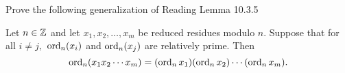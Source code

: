 \documentclass[handout]{ximera}
\begin{document}
\begin{br}
    Prove the following generalization of Reading Lemma 10.3.5
    
    
    \begin{lem*}
        Let $n\in\mathbb Z$ and let $x_1,x_2,\dots,x_m$ be reduced residues modulo $n$.  Suppose that for all $i\neq j,$ $\operatorname{ord}_n(x_i)$ and $\operatorname{ord}_n(x_j)$ are relatively prime. Then \[\operatorname{ord}_n(x_1 x_2\cdots x_m)=(\operatorname{ord}_n x_1)(\operatorname{ord}_n x_2)\cdots (\operatorname{ord}_n x_m).\]
    \end{lem*}
    \pdfOnly{\ifhandout
        \vfill
        \else\fi}
\end{br}
\end{document}
